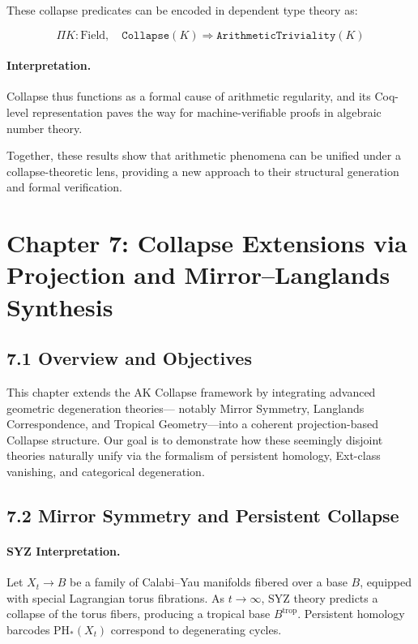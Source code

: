 \documentclass[11pt]{article}
\begin{document}
These collapse predicates can be encoded in dependent type theory as:

\[
\Pi K : \text{Field},\quad \texttt{Collapse}(K) \Rightarrow \texttt{ArithmeticTriviality}(K)
\]

\paragraph{Interpretation.}  
Collapse thus functions as a formal cause of arithmetic regularity,  
and its Coq-level representation paves the way for machine-verifiable proofs in algebraic number theory.

Together, these results show that arithmetic phenomena can be unified under a collapse-theoretic lens, providing a new approach to their structural generation and formal verification.



\section*{Chapter 7: Collapse Extensions via Projection and Mirror–Langlands Synthesis}

\subsection*{7.1 Overview and Objectives}

This chapter extends the AK Collapse framework by integrating advanced geometric degeneration theories—  
notably Mirror Symmetry, Langlands Correspondence, and Tropical Geometry—into a coherent projection-based Collapse structure.  
Our goal is to demonstrate how these seemingly disjoint theories naturally unify via the formalism of persistent homology,  
Ext-class vanishing, and categorical degeneration.

\subsection*{7.2 Mirror Symmetry and Persistent Collapse}

\paragraph{SYZ Interpretation.}
Let \( X_t \to B \) be a family of Calabi–Yau manifolds fibered over a base \( B \), equipped with special Lagrangian torus fibrations.  
As \( t \to \infty \), SYZ theory predicts a collapse of the torus fibers, producing a tropical base \( B^{\mathrm{trop}} \).  
Persistent homology barcodes \( \mathrm{PH}_*(X_t) \) correspond to degenerating cycles.
\end{document}
